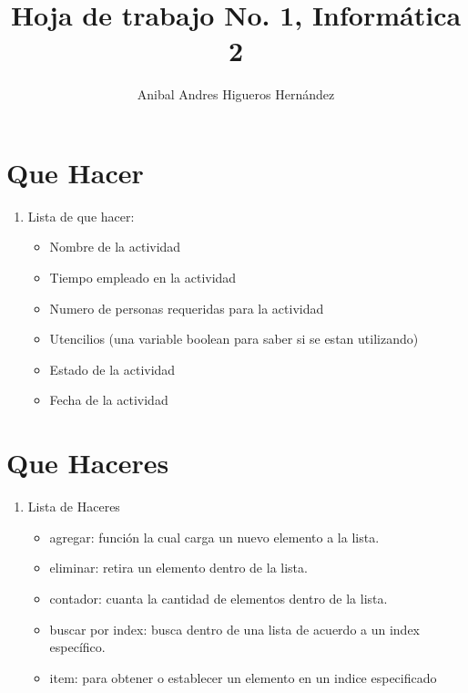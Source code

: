\documentclass{article}
\begin{document}
    \title{Hoja de trabajo No. 1, Informática 2}
    \author{Anibal Andres Higueros Hernández}
    \maketitle
    
    \section{Que Hacer}
    \begin{enumerate}
        \item Lista de que hacer:
        \begin{itemize}
            \item Nombre de la actividad
            \item Tiempo empleado en la actividad
            \item Numero de personas requeridas para la actividad
            \item Utencilios (una variable boolean para saber si se estan utilizando)
            \item Estado de la actividad
            \item Fecha de la actividad
        \end{itemize}
    \end{enumerate}
    \section{Que Haceres}
    \begin{enumerate}
       \item Lista de Haceres
       \begin{itemize}
           \item agregar: función la cual carga un nuevo elemento a la lista.
           \item eliminar: retira un elemento dentro de la lista.
           \item contador: cuanta la cantidad de elementos dentro de la lista.
           \item buscar por index: busca dentro de una lista de acuerdo a un index específico.
           \item item: para obtener o establecer un elemento en un indice especificado
       \end{itemize}
    \end{enumerate}
\end{document}
